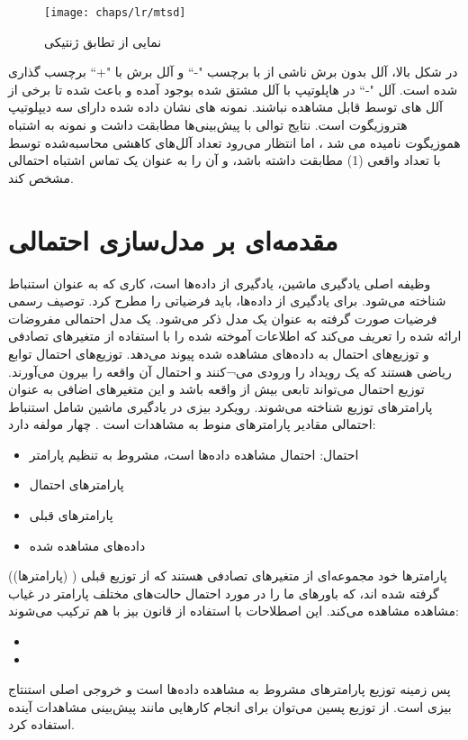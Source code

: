 \begin{figure}[!ht]
	\centerline{\texttt{[image: chaps/lr/mtsd]}}
	\caption{نمایی از تطابق ژنتیکی}
	\label{fig:ch_lr:mtsd}
\end{figure}

در شکل بالا، آلل  بدون برش ناشی از  با برچسب "-`` و آلل برش با "+`` برچسب گذاری شده است. آلل "-`` در هاپلوتیپ با آلل  مشتق شده بوجود آمده و باعث شده تا برخی از آلل های  توسط  قابل مشاهده نباشند. نمونه های نشان داده شده دارای سه دیپلوتیپ هتروزیگوت است. نتایج توالی با پیش‌بینی‌ها مطابقت داشت و نمونه  به اشتباه هموزیگوت نامیده می شد ، اما انتظار می‌رود تعداد آلل‌های کاهشی محاسبه‌شده توسط  با تعداد واقعی (1) مطابقت داشته باشد، و آن را به عنوان یک تماس اشتباه احتمالی مشخص کند.

\section{مقدمه‌ای بر مدل‌سازی احتمالی }

وظیفه اصلی یادگیری ماشین، یادگیری از داده‌ها است، کاری که به عنوان استنباط شناخته می‌شود. برای یادگیری از داده‌ها، باید فرضیاتی را مطرح کرد. توصیف رسمی فرضیات صورت گرفته به عنوان یک مدل ذکر می‌شود. یک مدل احتمالی مفروضات ارائه شده را تعریف می‌کند که اطلاعات آموخته شده را با استفاده از متغیرهای تصادفی و توزیع‌های احتمال به داده‌های مشاهده شده پیوند می‌دهد. توزیع‌های احتمال توابع ریاضی هستند که یک رویداد را ورودی می¬کنند و احتمال آن واقعه را بیرون می‌آورند. توزیع احتمال می‌تواند تابعی بیش از واقعه باشد و این متغیرهای اضافی به عنوان پارامترهای توزیع شناخته می‌شوند\cite{hanahan2000hallmarks}. 
رویکرد بیزی در یادگیری ماشین شامل استنباط احتمالی مقادیر پارامترهای منوط به مشاهدات است \cite{hanahan2011hallmarks}. چهار مولفه دارد:

\begin{itemize}
	\item 	احتمال: احتمال مشاهده داده‌ها است، مشروط به تنظیم پارامتر  
	\item 	پارامترهای احتمال
	\item	پارامترهای قبلی 
	\item داده‌های مشاهده شده
\end{itemize}
پارامترها خود مجموعه‌ای از متغیرهای تصادفی هستند که از توزیع قبلی ( (پارامترها)) گرفته شده اند، که باورهای ما را در مورد احتمال حالت‌های مختلف پارامتر در غیاب مشاهده مشاهده می‌کند. این اصطلاحات با استفاده از قانون بیز با هم ترکیب می‌شوند:
\begin{itemize}
	\item {}
	\item {}
\end{itemize}
پس زمینه توزیع پارامترهای مشروط به مشاهده داده‌ها است و خروجی اصلی استنتاج بیزی است. از توزیع پسین می‌توان برای انجام کارهایی مانند پیش‌بینی مشاهدات آینده استفاده کرد.


